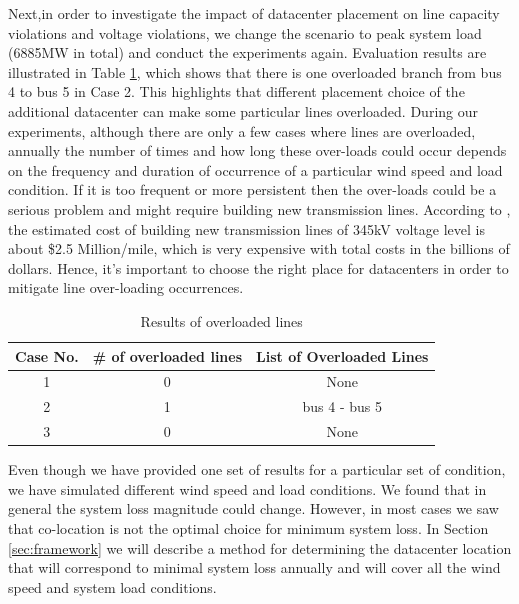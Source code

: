 Next,in order to investigate the impact of datacenter placement on line capacity violations and voltage violations, we change the scenario to peak system load (6885MW in total) and conduct the experiments again. Evaluation results are illustrated in Table \ref{tab:results-linevio}, which shows that there is one overloaded branch from bus 4 to bus 5 in Case 2. This highlights that different placement choice of the additional datacenter can make some particular lines overloaded. During our experiments, although there are only a few cases where lines are overloaded, annually the number of times and how long these over-loads could occur depends on the frequency and duration of occurrence of a particular wind speed and load condition. If it is too frequent or more persistent then the over-loads could be a serious problem and might require building new transmission lines. According to \cite{interconnection2010survey}, the estimated cost of building new transmission lines of 345kV voltage level is about \$2.5 Million/mile, which is very expensive with total costs in the billions of dollars. Hence, it's important to choose the right place for datacenters in order to mitigate line over-loading occurrences.


\begin{table}[ht]
\begin{center}
\caption{Results of overloaded lines}
\begin{tabular}{|c|c|c|}
\hline
Case No. & \# of overloaded lines & List of Overloaded Lines \\
\hline
1 & 0 & None\\
2 & 1 &  bus 4 - bus 5 \\
3 & 0 & None \\

\hline

\end{tabular}
   \vspace{.05in}
\label{tab:results-linevio}
\end{center}
\end{table}

Even though we have provided one set of results for a particular set of condition, we have simulated different wind speed and load conditions. We found that in general the system loss magnitude could change. However, in most cases we saw that co-location is not the optimal choice for minimum system loss. In Section \ref{sec:framework} we will describe a method for determining the datacenter location that will correspond to minimal system loss annually and will cover all the wind speed and system load conditions.

